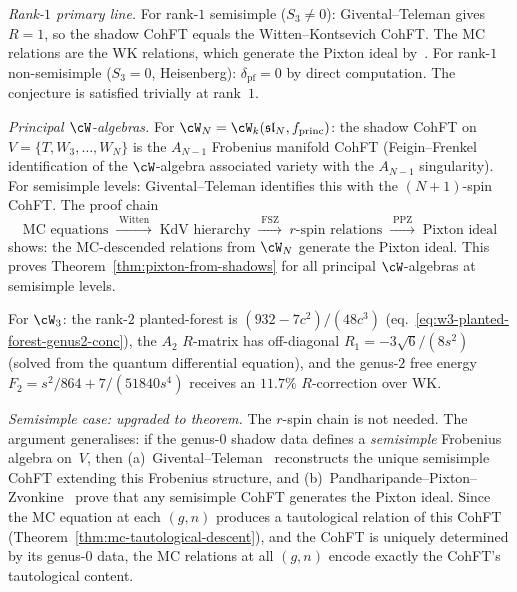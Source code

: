 \begin{remark}
\label{rem:pixton-conjecture-status}

\emph{Rank-$1$ primary line.}
For rank-$1$ semisimple ($S_3 \neq 0$):
Givental--Teleman gives $R = 1$, so the shadow CohFT equals the
Witten--Kontsevich CohFT. The MC relations are the WK relations,
which generate the Pixton ideal by~\cite{PPZ19}.
For rank-$1$ non-semisimple ($S_3 = 0$, Heisenberg):
$\delta_{\mathrm{pf}} = 0$ by direct computation.
The conjecture is satisfied trivially at rank~$1$.

\emph{Principal $\cW$-algebras.}
For $\cW_N = \cW_k(\mathfrak{sl}_N, f_{\mathrm{princ}})$:
the shadow CohFT on $V = \{T, W_3, \ldots, W_N\}$ is the
$A_{N-1}$ Frobenius manifold CohFT
(Feigin--Frenkel identification of the $\cW$-algebra
associated variety with the $A_{N-1}$ singularity).
For semisimple levels: Givental--Teleman identifies this with the
$(N{+}1)$-spin CohFT.
The proof chain
\[
\text{MC equations}
\;\xrightarrow{\;\text{Witten}\;}\;
\text{KdV hierarchy}
\;\xrightarrow{\;\text{FSZ}\;}\;
\text{$r$-spin relations}
\;\xrightarrow{\;\text{PPZ}\;}\;
\text{Pixton ideal}
\]
shows: the MC-descended relations from $\cW_N$ generate the Pixton
ideal. This proves
Theorem~\ref{thm:pixton-from-shadows} for all principal
$\cW$-algebras at semisimple levels.

For $\cW_3$: the rank-$2$ planted-forest is
$(932 - 7c^2)/(48c^3)$
(eq.~\eqref{eq:w3-planted-forest-genus2-conc}), the $A_2$ $R$-matrix
has off-diagonal $R_1 = -3\sqrt{6}/(8s^2)$ (solved from the
quantum differential equation), and the genus-$2$ free energy
$F_2 = s^2/864 + 7/(51840 s^4)$ receives an $11.7\%$ $R$-correction
over WK.

\emph{Semisimple case: upgraded to theorem.}
The $r$-spin chain is not needed. The argument generalises:
if the genus-$0$ shadow data defines a \emph{semisimple}
Frobenius algebra on~$V$, then
(a)~Givental--Teleman~\cite{Givental01,Teleman12} reconstructs the
unique semisimple CohFT extending this Frobenius structure, and
(b)~Pandharipande--Pixton--Zvonkine~\cite{PPZ19} prove that any
semisimple CohFT generates the Pixton ideal.
Since the MC equation at each $(g,n)$ produces a tautological relation
of this CohFT
(Theorem~\ref{thm:mc-tautological-descent}), and the CohFT is
uniquely determined by its genus-$0$ data, the MC relations at all
$(g,n)$ encode exactly the CohFT's tautological content.


\end{remark}
